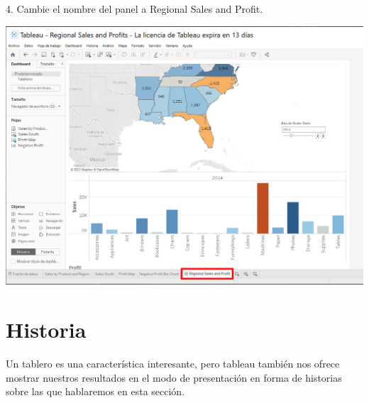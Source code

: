 \documentclass[12pt,letterpaper]{article}
\begin{document}
4. Cambie el nombre del panel a Regional Sales and Profit.
\begin{center}
    \includegraphics[width=16cm]{img/58.png}  
\end{center}

\section{Historia}
Un tablero es una característica interesante, pero tableau también nos ofrece mostrar
nuestros resultados en el modo de presentación en forma de historias sobre las que
hablaremos en esta sección.
\end{document}
